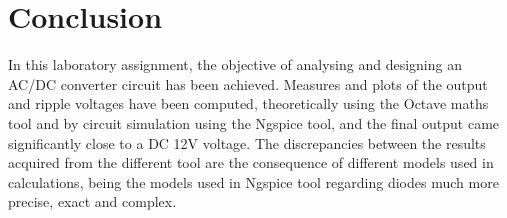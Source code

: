 \section{Conclusion}
\label{sec:conclusion}

In this laboratory assignment, the objective of analysing and designing an AC/DC converter circuit has been achieved. Measures and plots of the output and ripple voltages have been computed, theoretically using the Octave maths tool and by circuit simulation using the Ngspice tool, and the final output came significantly close to a DC 12V voltage. The discrepancies between the results acquired from the different tool are the consequence of different models used in calculations, being the models used in Ngspice tool regarding diodes much more precise, exact and complex.


